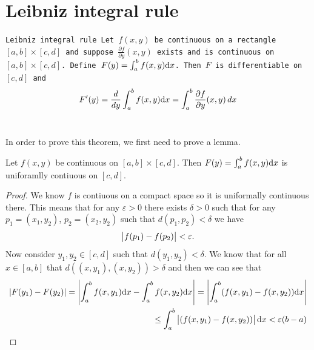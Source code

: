 \documentclass[11pt,a4paper]{article}
\begin{document}
	\newpage
	
	\section{Leibniz integral rule}
  \begin{theorem}\label{thm:leibniz-integral-rule}\tt{Leibniz integral rule}
    Let $f(x,y)$ be continuous on a rectangle $[a,b] \times [c,d]$ 
    and suppose $\frac{\partial f}{\partial y}(x,y)$ exists and is continuous 
    on $[a,b] \times [c,d]$. 
    Define $F(y) = \int_a^b{f(x,y)}\dx$.
    Then $F$ is differentiable on $[c,d]$ and
    \[
      F'(y) =
      \frac{d}{dy}\int_a^b{f(x,y)}\dx =
      \int_{a}^{b}{\frac{\partial f}{\partial y}(x,y)\, dx}
    \]
  \end{theorem}
  
  In order to prove this theorem, we first need to prove a lemma.
  \begin{lemma}
    Let $f(x,y)$ be continuous on $[a,b] \times [c,d]$.
    Then $F(y) = \int_{a}^{b} f(x,y)\dx$ is uniforamlly contiuous on $[c,d]$.
  \end{lemma}
  \begin{proof}
    We know $f$ is contiuous on a compact space so it is uniformally continuous 
    there. This means that for any $\varepsilon > 0$ there exists $\delta > 0$
    such that for any $p_1 = (x_1,y_2)$, $p_2 = (x_2,y_2)$ such that 
    $d(p_1,p_2) < \delta$ we have
    \[
      \left\lvert f(p_1) - f(p_2)\right\rvert < \varepsilon.
    \]
    Now consider $y_1, y_2 \in[c,d]$ such that $d(y_1,y_2) < \delta$.
    We know that for all $x \in [a,b]$ that $d((x,y_1),(x,y_2)) > \delta$
    and then we can see that
    \begin{align*}
      |F(y_1)-F(y_2)| 
      = \abs{\int_{a}^{b} f(x,y_1)\dx - \int_a^b{f(x,y_2)\dx}}
      = \abs{\int_{a}^{b} (f(x,y_1) - f(x,y_2))\dx} \\
      \le \int_{a}^{b} \abs{(f(x,y_1) - f(x,y_2))}\dx < \varepsilon(b - a)
    \end{align*}
  \end{proof}
\end{document}
